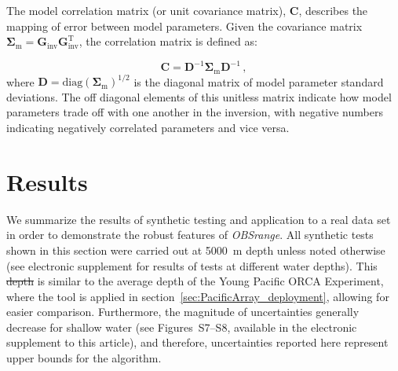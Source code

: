 \documentclass[10pt,titlepage]{article}
\providecommand{\DIFaddtex}[1]{{\protect\color{blue}\uwave{#1}}} %
\providecommand{\DIFdeltex}[1]{{\protect\color{red}\sout{#1}}}                      %
\providecommand{\DIFaddbegin}{} %
\providecommand{\DIFaddend}{} %
\providecommand{\DIFdelbegin}{} %
\providecommand{\DIFdelend}{} %
\providecommand{\DIFadd}[1]{\texorpdfstring{\DIFaddtex{#1}}{#1}} %
\providecommand{\DIFdel}[1]{\texorpdfstring{\DIFdeltex{#1}}{}} %
\begin{document}
The model correlation matrix (or unit covariance matrix), $\mathbf{C}$, describes the mapping of error between model parameters. Given the covariance matrix \DIFdelbegin \DIFdel{$\mathbf{\Sigma}_{\text{m}} = \mathbf{G}_{\text{inv}} \mathbf{G}_{\text{inv}}^{\text{T}}$}\DIFdelend \DIFaddbegin \DIFadd{$\mathbf{\Sigma}_{\text{m}} = \mathbf{G}_{\text{inv}} \mathbf{\Sigma}_{\text{d}} \mathbf{G}_{\text{inv}}^{\text{T}}$}\DIFaddend , the correlation matrix is defined as:

\begin{equation}
\mathbf{C} = \mathbf{D}^{-1}\mathbf{\Sigma}_{\text{m}}\mathbf{D}^{-1} \,,
\end{equation}
where $\mathbf{D} = \text{diag}(\mathbf{\Sigma}_{\text{m}})^{1/2}$ is the diagonal matrix of model parameter standard deviations. The off diagonal elements of this unitless matrix indicate how model parameters trade off with one another in the inversion, with negative numbers indicating negatively correlated parameters and vice versa.









\section{Results }
We summarize the results of synthetic testing and application to a real data set in order to demonstrate the robust features of \textit{OBSrange}. All synthetic tests shown in this section were carried out at 5000~m \DIFaddbegin \DIFadd{water }\DIFaddend depth unless noted otherwise (see electronic supplement for results of tests at different water depths). This \DIFdelbegin \DIFdel{depth }\DIFdelend is similar to the average \DIFaddbegin \DIFadd{water }\DIFaddend depth of the Young Pacific ORCA Experiment, where the tool is applied in section~\ref{sec:PacificArray_deployment}, allowing for easier comparison. Furthermore, the magnitude of uncertainties generally decrease for shallow water (see Figures~S7--S8, available in the electronic supplement to this article), and therefore, uncertainties reported here represent upper bounds for the algorithm.
\end{document}
